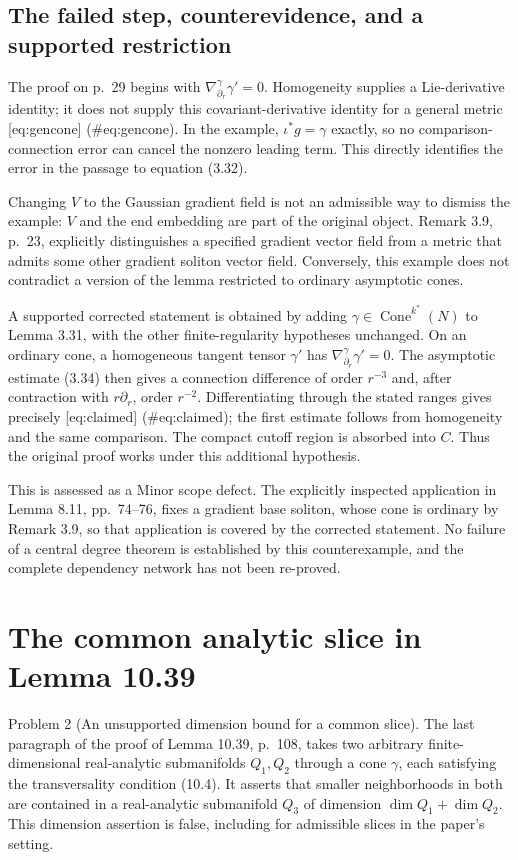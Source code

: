 \documentclass[10pt]{article}
\begin{document}
\subsection*{The failed step, counterevidence, and a supported restriction}
The proof on p. 29 begins with \(\nabla^\gamma_{\partial_r}\gamma'=0\). Homogeneity supplies a Lie-derivative identity; it does not supply this covariant-derivative identity for a general metric [eq:gencone] (\#eq:gencone). In the example, \(\iota^*g=\gamma\) exactly, so no comparison-connection error can cancel the nonzero leading term. This directly identifies the error in the passage to equation (3.32).\par
Changing \(V\) to the Gaussian gradient field is not an admissible way to dismiss the example: \(V\) and the end embedding are part of the original object. Remark 3.9, p. 23, explicitly distinguishes a specified gradient vector field from a metric that admits some other gradient soliton vector field. Conversely, this example does not contradict a version of the lemma restricted to ordinary asymptotic cones.\par
A supported corrected statement is obtained by adding \(\gamma\in\operatorname{Cone}^{k^*}(N)\) to Lemma 3.31, with the other finite-regularity hypotheses unchanged. On an ordinary cone, a homogeneous tangent tensor \(\gamma'\) has \(\nabla^\gamma_{\partial_r}\gamma'=0\). The asymptotic estimate (3.34) then gives a connection difference of order \(r^{-3}\) and, after contraction with \(r\partial_r\), order \(r^{-2}\). Differentiating through the stated ranges gives precisely [eq:claimed] (\#eq:claimed); the first estimate follows from homogeneity and the same comparison. The compact cutoff region is absorbed into \(C\). Thus the original proof works under this additional hypothesis.\par
This is assessed as a Minor scope defect. The explicitly inspected application in Lemma 8.11, pp. 74–76, fixes a gradient base soliton, whose cone is ordinary by Remark 3.9, so that application is covered by the corrected statement. No failure of a central degree theorem is established by this counterexample, and the complete dependency network has not been re-proved.\par
\section*{The common analytic slice in Lemma 10.39}
Problem 2 (An unsupported dimension bound for a common slice).  The last paragraph of the proof of Lemma 10.39, p. 108, takes two arbitrary finite-dimensional real-analytic submanifolds \(Q_1,Q_2\) through a cone \(\gamma\), each satisfying the transversality condition (10.4). It asserts that smaller neighborhoods in both are contained in a real-analytic submanifold \(Q_3\) of dimension \(\dim Q_1+\dim Q_2\). This dimension assertion is false, including for admissible slices in the paper’s setting.\par
\end{document}
